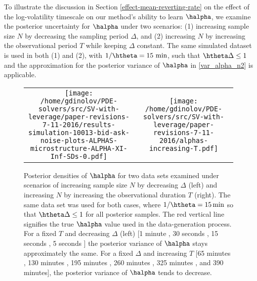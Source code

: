 To illustrate the discussion in Section \ref{effect-mean-reverting-rate} on the effect of the log-volatility timescale on our method's ability to learn $\halpha$, we examine the posterior uncertainty for $\halpha$ under two scenarios: (1) increasing sample size $N$ by decreasing the sampling period $\Delta$, and (2) increasing $N$ by increasing the observational period $T$ while keeping $\Delta$ constant. The same simulated dataset is used in both (1) and (2), with $1/\htheta = 15 \mbox{ min}$, such that $\htheta \Delta \leq 1$ and the approximation for the posterior variance of $\halpha$ in \eqref{var_alpha_n2} is applicable.
\begin{figure}[h!]
\centering
\begin{tabular}{cc}
			\begin{minipage}{0.45\textwidth}
				\centering
				\texttt{[image: /home/gdinolov/PDE-solvers/src/SV-with-leverage/paper-revisions-7-11-2016/results-simulation-10013-bid-ask-noise-plots-ALPHAS-microstructure-ALPHA-XI-Inf-SDs-0.pdf]}
			\end{minipage}
			& \begin{minipage}{0.45\textwidth}
				\centering
				\texttt{[image: /home/gdinolov/PDE-solvers/src/SV-with-leverage/paper-revisions-7-11-2016/alphas-increasing-T.pdf]}
				\end{minipage}
\end{tabular}
\caption{Posterior densities of $\halpha$ for two data sets examined under scenarios of increasing sample size $N$ by decreasing $\Delta$ (left) and increasing $N$ by increasing the observational duration $T$ (right). The same data set was used for both cases, where $1/\htheta = 15\, \mbox{min}$ so that $\htheta \Delta \leq 1$ for all posterior samples. The red vertical line signifies the true $\halpha$ value used in the data-generation process. For a fixed $T$ and decreasing $\Delta$ (left) [1 minute \usebox{\legendLineOne}, 30 seconds \usebox{\legendLineTwo}, 15 seconds \usebox{\legendLineThree}, 5 seconds \usebox{\legendLineFour}] the posterior variance of $\halpha$ stays approximately the same. For a fixed $\Delta$ and increasing $T$ [65 minutes \usebox{\legendLineOne}, 130 minutes \usebox{\legendLineTwo}, 195 minutes \usebox{\legendLineThree}, 260 minutes \usebox{\legendLineFour}, 325 minutes \usebox{\legendLineFive}, and 390 \usebox{\legendLineTwo} minutes], the posterior variance of $\halpha$ tends to decrease.}\label{fig:different-phi}
\end{figure}

